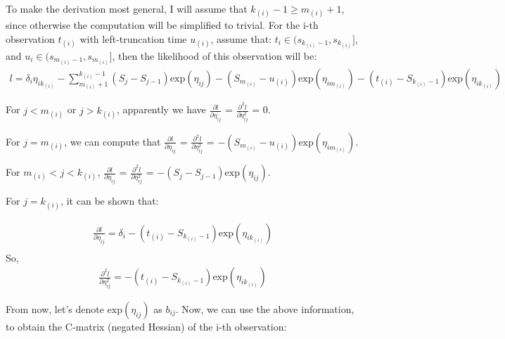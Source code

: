 \documentclass[]{article}
\begin{document}
To make the derivation most general, I will assume that
\(k_{(i)}-1 \geq m_{(i)}+1\), since otherwise the computation will be
simplified to trivial. For the i-th observation \(t_{(i)}\) with
left-truncation time \(u_{(i)}\), assume that:
\(t_i \in (s_{k_{(i)}-1},s_{k_{(i)}}]\), and
\(u_i \in (s_{m_{(i)}-1},s_{m_{(i)}}]\), then the likelihood of this
observation will be:
\begin{equation}\begin{aligned}\label{eqn:ind_i_log}
l = \delta_i \eta_{ik_{(i)}} - \sum_{m_{(i)}+1}^{k_{(i)}-1} (S_j - S_{j-1}) \text{exp}(\eta_{ij}) - (S_{m_{(i)}}-u_{(i)})\text{exp}(\eta_{im_{(i)}})-(t_{(i)}-S_{k_{(i)}-1})\text{exp}(\eta_{ik_{(i)}})
\end{aligned}\end{equation}

For \(j<m_{(i)}\) or \(j>k_{(i)}\), apparently we have
\(\frac{ \partial l}{\partial \eta_{ij}}\) =
\(\frac{ \partial^2 l}{\partial \eta_{ij}^2}\) = 0.

For \(j = m_{(i)}\), we can compute that
\(\frac{ \partial l}{\partial \eta_{ij}}\) =
\(\frac{ \partial^2 l}{\partial \eta_{ij}^2}\) =
\(- (S_{m_{(i)}}-u_{(i)})\text{exp}(\eta_{im_{(i)}})\).

For \(m_{(i)} < j < k_{(i)}\),
\(\frac{ \partial l}{\partial \eta_{ij}}\) =
\(\frac{ \partial^2 l}{\partial \eta_{ij}^2}\) =
\(- (S_j-S_{j-1})\text{exp}(\eta_{ij})\).

For \(j = k_{(i)}\), it can be shown that:

\begin{equation}\begin{aligned}\label{eqn:smalladd}
\frac{ \partial l}{\partial \eta_{ij}} = \delta_i - (t_{(i)}-S_{k_{(i)}-1})\text{exp}(\eta_{ik_{(i)}}) \\
\end{aligned}\end{equation} So,
\begin{equation}\begin{aligned}\label{eqn:smalladd2}
\frac{ \partial^2 l}{\partial \eta_{ij}^2} = - (t_{(i)}-S_{k_{(i)}-1})\text{exp}(\eta_{ik_{(i)}})
\end{aligned}\end{equation}

From now, let's denote \(\text{exp}(\eta_{ij})\) as \(b_{ij}\). Now, we
can use the above information, to obtain the C-matrix (negated Hessian)
of the i-th observation:
\end{document}
